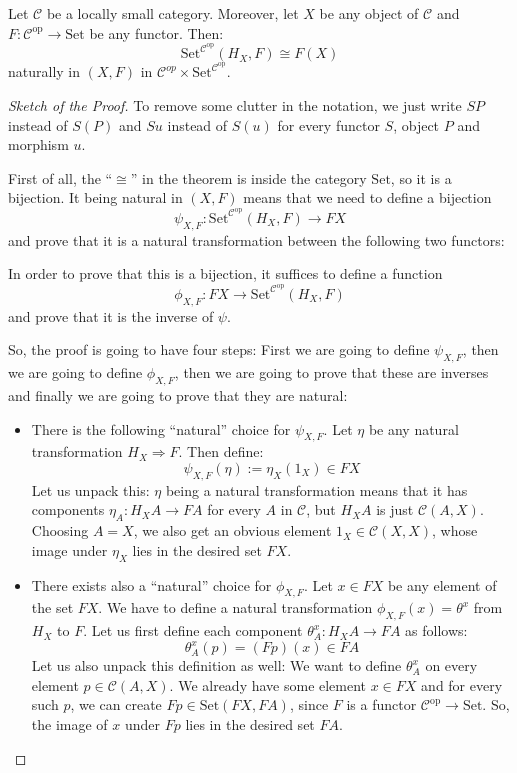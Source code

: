 \begin{theorem}[Yoneda, 4.2.1] Let $\mathcal{C}$ be a locally small category. Moreover, let $X$ be any object of $\mathcal{C}$ and $F:\mathcal{C}^{\mathrm{op}}\to\mathrm{Set}$ be any functor. Then:
\[\mathrm{Set}^{\mathcal{C}^{\mathrm{op}}}(H_X,F)\cong F(X)\]
naturally in $(X,F)$ in $\mathcal{C}^{op}\times\mathrm{Set}^{\mathcal{C}^{\mathrm{op}}}$.
\end{theorem}
\begin{proof}[Sketch of the Proof] To remove some clutter in the notation, we just write $SP$ instead of $S(P)$ and $Su$ instead of $S(u)$ for every functor $S$, object $P$ and morphism $u$.

First of all, the ``$\cong$'' in the theorem is inside the category $\mathrm{Set}$, so it is a bijection. It being natural in $(X,F)$ means that we need to define a bijection
\[\psi_{X,F}:\mathrm{Set}^{\mathcal{C}^{\mathrm{op}}}(H_X,F)\to FX\]
and prove that it is a natural transformation between the following two functors:
\begin{center}
\end{center}
In order to prove that this is a bijection, it suffices to define a function
\[\phi_{X,F}:FX\to\mathrm{Set}^{\mathcal{C}^{\mathrm{op}}}(H_X,F)\]
and prove that it is the inverse of $\psi$.

So, the proof is going to have four steps: First we are going to define $\psi_{X,F}$, then we are going to define $\phi_{X,F}$, then we are going to prove that these are inverses and finally we are going to prove that they are natural:
\begin{itemize}
\item There is the following ``natural'' choice for $\psi_{X,F}$. Let $\eta$ be any natural transformation $H_X\Rightarrow F$. Then define:
\[\psi_{X,F}(\eta):=\eta_X(1_X)\in FX\]
Let us unpack this: $\eta$ being a natural transformation means that it has components $\eta_A:H_XA\to FA$ for every $A$ in $\mathcal{C}$, but $H_XA$ is just $\mathcal{C}(A,X)$. Choosing $A=X$, we also get an obvious element $1_X\in\mathcal{C}(X,X)$, whose image under $\eta_X$ lies in the desired set $FX$.

\item There exists also a ``natural'' choice for $\phi_{X,F}$. Let $x\in FX$ be any element of the set $FX$. We have to define a natural transformation $\phi_{X,F}(x)=\theta^x$ from $H_X$ to $F$. Let us first define each component $\theta^x_A:H_XA\to FA$ as follows:
\[\theta^x_A(p)=(Fp)(x)\in FA\]
Let us also unpack this definition as well: We want to define $\theta^x_A$ on every element $p\in\mathcal{C}(A,X)$. We already have some element $x\in FX$ and for every such $p$, we can create $Fp\in\mathrm{Set}(FX,FA)$, since $F$ is a functor $\mathcal{C}^{\mathrm{op}}\to\mathrm{Set}$. So, the image of $x$ under $Fp$ lies in the desired set $FA$.


\end{itemize}
\end{proof}
